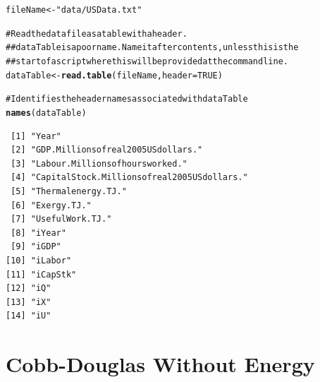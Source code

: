 \documentclass[10pt]{article}\usepackage{graphicx, color}
\makeatletter
\newcommand{\hlfunctioncall}[1]{\textcolor[rgb]{0.501960784313725,0,0.329411764705882}{\textbf{#1}}}%
\newcommand{\hlstring}[1]{\textcolor[rgb]{0.6,0.6,1}{#1}}%
\newcommand{\hlcomment}[1]{\textcolor[rgb]{0.180392156862745,0.6,0.341176470588235}{#1}}%
\newenvironment{kframe}{%
 \def\at@end@of@kframe{}%
 \ifinner\ifhmode%
  \def\at@end@of@kframe{\end{minipage}}%
  \begin{minipage}{\columnwidth}%
 \fi\fi%
 \def\FrameCommand##1{\hskip\@totalleftmargin \hskip-\fboxsep
 \colorbox{shadecolor}{##1}\hskip-\fboxsep
     \hskip-\linewidth \hskip-\@totalleftmargin \hskip\columnwidth}%
 \MakeFramed {\advance\hsize-\width
   \@totalleftmargin\z@ \linewidth\hsize
   \@setminipage}}%
 {\par\unskip\endMakeFramed%
 \at@end@of@kframe}
\newenvironment{knitrout}{}{} %
\makeatother
\begin{document}
\begin{knitrout}
\color{fgcolor}\begin{kframe}
\begin{alltt}
fileName <- \hlstring{"data/USData.txt"}

\hlcomment{# Read the data file as a table with a header.  }
\hlcomment{## dataTable is a poor name.  Name it after contents, unless this is the }
\hlcomment{## start of a script where this will be provided at the command line.}
dataTable <- \hlfunctioncall{read.table}(fileName, header = TRUE)

\hlcomment{# Identifies the header names associated with dataTable}
\hlfunctioncall{names}(dataTable)
\end{alltt}
\begin{verbatim}
 [1] "Year"                                     
 [2] "GDP.Millionsofreal2005USdollars."         
 [3] "Labour.Millionsofhoursworked."            
 [4] "CapitalStock.Millionsofreal2005USdollars."
 [5] "Thermalenergy.TJ."                        
 [6] "Exergy.TJ."                               
 [7] "UsefulWork.TJ."                           
 [8] "iYear"                                    
 [9] "iGDP"                                     
[10] "iLabor"                                   
[11] "iCapStk"                                  
[12] "iQ"                                       
[13] "iX"                                       
[14] "iU"                                       
\end{verbatim}
\end{kframe}
\end{knitrout}


\section{Cobb-Douglas Without Energy}
\end{document}
